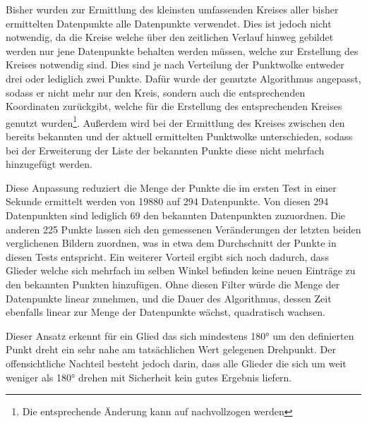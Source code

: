 
Bisher wurden zur Ermittlung des kleinsten umfassenden Kreises aller bisher ermittelten Datenpunkte alle Datenpunkte verwendet.
Dies ist jedoch nicht notwendig, da die Kreise welche über den zeitlichen Verlauf hinweg gebildet werden nur jene Datenpunkte behalten werden müssen, welche zur Erstellung des Kreises notwendig sind.
Dies sind je nach Verteilung der Punktwolke entweder drei oder lediglich zwei Punkte.
Dafür wurde der genutzte Algorithmus angepasst, sodass er nicht mehr nur den Kreis, sondern auch die entsprechenden Koordinaten zurückgibt, welche für die Erstellung des entsprechenden Kreises genutzt wurden\footnote{Die entsprechende Änderung kann auf  nachvollzogen werden}.
Außerdem wird bei der Ermittlung des Kreises zwischen den bereits bekannten und der aktuell ermittelten Punktwolke unterschieden, sodass bei der Erweiterung der Liste der bekannten Punkte diese nicht mehrfach hinzugefügt werden.

Diese Anpassung reduziert die Menge der Punkte die im ersten Test in einer Sekunde ermittelt werden von 19880 auf 294 Datenpunkte.
Von diesen 294 Datenpunkten sind lediglich 69 den bekannten Datenpunkten zuzuordnen.
Die anderen 225 Punkte lassen sich den gemessenen Veränderungen der letzten beiden verglichenen Bildern zuordnen, was in etwa dem Durchschnitt der Punkte in diesen Tests entspricht.
Ein weiterer Vorteil ergibt sich noch dadurch, dass Glieder welche sich mehrfach im selben Winkel befinden keine neuen Einträge zu den bekannten Punkten hinzufügen.
Ohne diesen Filter würde die Menge der Datenpunkte linear zunehmen, und die Dauer des Algorithmus, dessen Zeit ebenfalls linear zur Menge der Datenpunkte wächst, quadratisch wachsen.


Dieser Ansatz erkennt für ein Glied das sich mindestens 180° um den definierten Punkt dreht ein sehr nahe am tatsächlichen Wert gelegenen Drehpunkt.
Der offensichtliche Nachteil besteht jedoch darin, dass alle Glieder die sich um weit weniger als 180° drehen mit Sicherheit kein gutes Ergebnis liefern.

